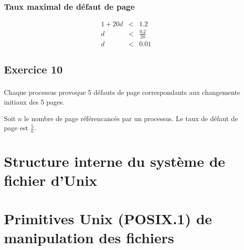 \documentclass[12pt,a4paper,openany]{book}
\begin{document}
		\subsection{Taux maximal de défaut de page}
		\begin{eqnarray*}
			1 + 20d &<& 1.2\\
			d &<& \frac{0.2}{20}\\
			d &<& 0.01
		\end{eqnarray*}
		\section{Exercice 10}
		\subsection{}
			Chaque processus provoque 5 défauts de page correspondants aux changements initiaux des 5 pages.

			Soit $n$ le nombre de page référencancés par un processus. Le taux de défaut de page est $\frac{5}{n}$.
	\chapter{Structure interne du système de fichier d'Unix}
	\chapter{Primitives Unix (POSIX.1) de manipulation des fichiers}
		
\end{document}
